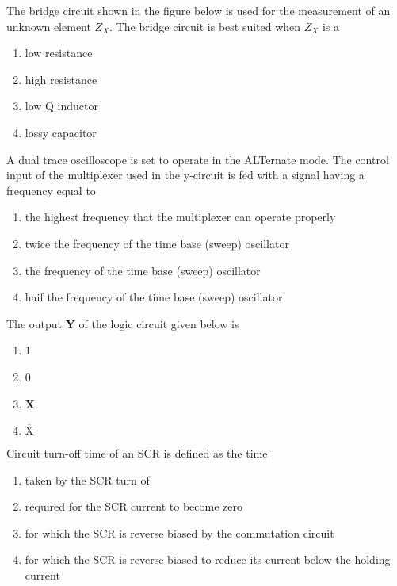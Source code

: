 \item The bridge circuit shown in the figure below is used for the measurement of an unknown element $Z_X.$ The bridge circuit is best suited when $Z_X$ is a 
\begin{figure}[!ht]
\centering
\resizebox{0.5\textwidth}{!}{%

}%
\end{figure}
\begin{enumerate}
     \item low resistance 
     \item high resistance
     \item low Q inductor
     \item lossy capacitor \\
 \end{enumerate}
\item A dual trace oscilloscope is set to operate in the ALTernate mode. The control input of the multiplexer used in the y-circuit is fed with a signal having a frequency equal to 
\begin{enumerate}
    \item the highest frequency that the multiplexer can operate properly 
    \item twice the frequency of the time base (sweep) oscillator
    \item the frequency of the time base (sweep) oscillator
    \item haif the frequency of the time base (sweep) oscillator \\
\end{enumerate}
\item The output \textbf{Y} of the logic circuit given below is
\begin{figure}[!ht]
\centering
\resizebox{0.5\textwidth}{!}{%

}%
\end{figure}
\begin{enumerate}
    \item 1
    \item 0
    \item \textbf{X}
    \item \textbf{$\overline{\text{X}}$} \\
\end{enumerate}
\item Circuit turn-off time of an SCR is defined as the time
  \begin{enumerate}
    \item taken by the SCR turn of 
    \item required for the SCR current to become zero 
    \item for which the SCR is reverse biased by the commutation circuit 
    \item for which the SCR is reverse biased to reduce its current below the holding current \\
\end{enumerate}
